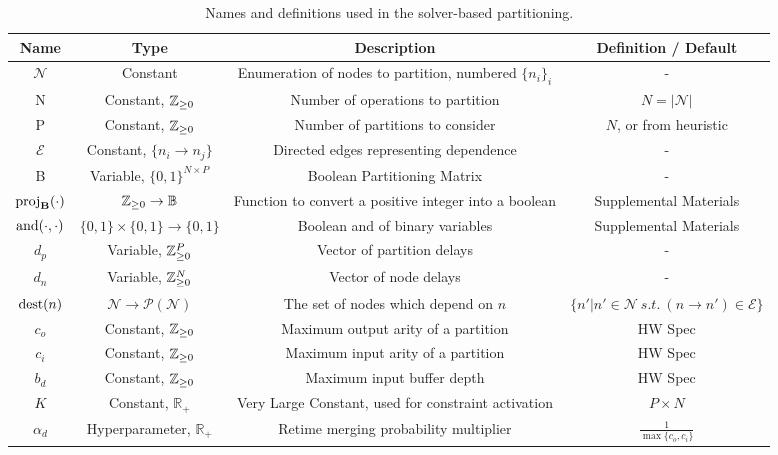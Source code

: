 \begin{table*}
  \centering
	\begin{tabular}{c | c | c | c}
		\textbf{Name} & \textbf{Type} & \textbf{Description} & \textbf{Definition / Default}\\\hline
		$\mathcal{N}$ & Constant & Enumeration of nodes to partition, numbered $\{n_i\}_i$ & - \\
		N & Constant, $\mathbb{Z}_{\ge 0}$ & Number of operations to partition & $N = |\mathcal{N}|$\\
		P & Constant, $\mathbb{Z}_{\ge 0}$ & Number of partitions to consider & $N$, or from heuristic \\
		$\mathcal{E}$ & Constant, $\{n_i \to n_j\}$& Directed edges representing dependence & - \\
		B & Variable, $\{0, 1\}^{N \times P}$ & Boolean Partitioning Matrix& - \\
		$\text{proj}_\mathbf{B}(\cdot)$ & $\mathbb{Z}_{\ge 0} \to \mathbb{B}$ & Function to convert a positive integer into a boolean& Supplemental Materials\\
		$\operatorname*{and}(\cdot, \cdot)$ & $\{0, 1\} \times \{0, 1\} \to \{0, 1\}$ & Boolean and of binary variables & Supplemental Materials \\ 
		$d_p$ & Variable, $\mathbb{Z}_{\ge 0}^P$ & Vector of partition delays & - \\
		$d_n$ & Variable, $\mathbb{Z}_{\ge 0}^N$ & Vector of node delays & - \\
		$\operatorname*{dest}(n)$ & $\mathcal{N} \to \mathcal{P}(\mathcal{N})$& The set of nodes which depend on $n$& $\{n' | n' \in \mathcal{N}\ s.t.\ (n \to n') \in \mathcal{E}\}$\\
		$c_o$ & Constant, $\mathbb{Z}_{\ge 0}$ & Maximum output arity of a partition & HW Spec \\
		$c_i$ & Constant, $\mathbb{Z}_{\ge 0}$ & Maximum input arity of a partition & HW Spec \\
		$b_d$ & Constant, $\mathbb{Z}_{\ge 0}$ & Maximum input buffer depth & HW Spec \\
		$K$ & Constant, $\mathbb{R}_+$ & Very Large Constant, used for constraint activation & $P \times N$ \\
		$\alpha_d$ & Hyperparameter, $\mathbb{R}_+$ & Retime merging probability multiplier& $\frac{1}{\max\{c_o, c_i\}}$ \\
	\end{tabular}
	\caption{Names and definitions used in the solver-based partitioning.}
	\label{tab:solver-variables}


\end{table*}
